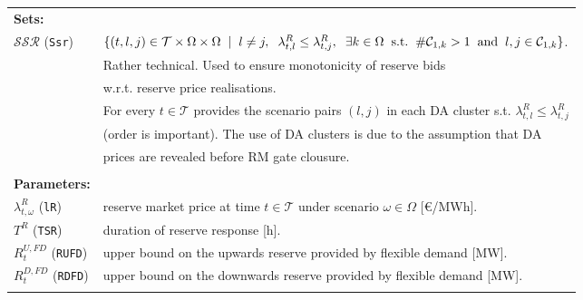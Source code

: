 \documentclass{article}
\begin{document}
\begin{tabularx}{\textwidth}{l l}
    \textbf{Sets:} \\
		$\mathcal{SSR}$ (\verb|Ssr|) & $\{(t, l, j) \in \mathcal{T} \times \Omega \times \Omega \hspace{2mm} | \hspace{2mm} l \neq j, \hspace{2mm} \lambda^R_{t, l} \leq \lambda^R_{t, j}, \hspace{2mm} \exists k \in \Omega \hspace{2mm} \text{s.t.} \hspace{2mm} \# \mathcal{C}_{1, k} > 1 \hspace{2mm} \text{and} \hspace{2mm} l, j \in \mathcal{C}_{1, k} \}$.  \\
	& Rather technical. Used to ensure monotonicity of reserve bids \\
	& w.r.t. reserve price realisations. \\  
	& For every $t \in \mathcal{T}$ provides the scenario pairs $(l, j)$ in each DA cluster s.t. $\lambda^R_{t, l} \leq \lambda^R_{t, j}$ \\
	& (order is important). The use of DA clusters is due to the assumption that DA \\
	& prices are revealed before RM gate clousure.\\	   
    \\
    \textbf{Parameters:} \\
    	$\lambda^{R}_{t, \omega}$ (\verb|lR|) & reserve market price at time $t \in \mathcal{T}$ under scenario $\omega \in \Omega$ [\euro/MWh]. \\
    	$T^R$ (\verb|TSR|) & duration of reserve response [h]. \\
    	$R^{U, FD}_t$ (\verb|RUFD|) & upper bound on the upwards reserve provided by flexible demand [MW]. \\
    	$R^{D, FD}_t$ (\verb|RDFD|) & upper bound on the downwards reserve provided by flexible demand [MW]. \\
    \\
       

\end{tabularx}
\end{document}
